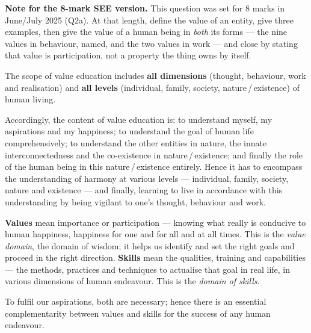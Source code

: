 \begin{keybox}
\textbf{\sffamily Note for the 8-mark SEE version.} This question was set for
8 marks in June/July 2025 (Q2a). At that length, define the value of an
entity, give three examples, then give the value of a human being in
\emph{both} its forms --- the nine values in behaviour, named, and the two
values in work --- and close by stating that value is participation, not a
property the thing owns by itself.
\end{keybox}


\ans The scope of value education includes \textbf{all dimensions} (thought,
behaviour, work and realisation) and \textbf{all levels} (individual, family,
society, nature\,/\,existence) of human living.

Accordingly, the content of value education is: to understand myself, my
aspirations and my happiness; to understand the goal of human life
comprehensively; to understand the other entities in nature, the innate
interconnectedness and the co-existence in nature\,/\,existence; and finally
the role of the human being in this nature\,/\,existence entirely. Hence it
has to encompass the understanding of harmony at various levels ---
individual, family, society, nature and existence --- and finally, learning to
live in accordance with this understanding by being vigilant to one's thought,
behaviour and work.


\ans \textbf{Values} mean importance or participation --- knowing what really
is conducive to human happiness, happiness for one and for all and at all
times. This is the \emph{value domain}, the domain of wisdom; it helps us
identify and set the right goals and proceed in the right direction.
\textbf{Skills} mean the qualities, training and capabilities --- the methods,
practices and techniques to actualise that goal in real life, in various
dimensions of human endeavour. This is the \emph{domain of skills}.

To fulfil our aspirations, both are necessary; hence there is an essential
complementarity between values and skills for the success of any human
endeavour.

